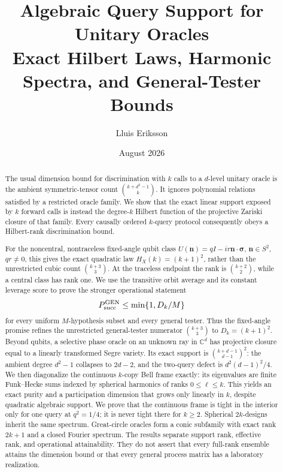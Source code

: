 \documentclass[11pt]{article}
\title{\textbf{Algebraic Query Support for Unitary Oracles}\\
Exact Hilbert Laws, Harmonic Spectra, and General-Tester Bounds}
\author{Lluis Eriksson}
\date{August 2026}
\theoremstyle{definition}
\theoremstyle{remark}
\newcommand{\C}{\mathbb C}
\begin{document}
\maketitle

\begin{abstract}
The usual dimension bound for discrimination with $k$ calls to a $d$-level
unitary oracle is the ambient symmetric-tensor count
$\binom{k+d^2-1}{k}$.  It ignores polynomial relations satisfied by a
restricted oracle family.  We show that the exact linear support exposed by
$k$ forward calls is instead the degree-$k$ Hilbert function of the
projective Zariski closure of that family.  Every causally ordered $k$-query
protocol consequently obeys a Hilbert-rank discrimination bound.

For the noncentral, nontraceless fixed-angle qubit class
$U(\bm n)=qI-ir\bm n\cdot\bm\sigma$, $\bm n\in S^2$, $qr\neq0$, this gives the exact
quadratic law $H_X(k)=(k+1)^2$, rather than the unrestricted cubic count
$\binom{k+3}{3}$.  At the traceless endpoint the rank is
$\binom{k+2}{2}$, while a central class has rank one.  We use the transitive
orbit average and its constant leverage score to
prove the stronger operational statement
\[
 P_{\rm succ}^{\rm GEN}\leq \min\{1,D_k/M\}
\]
for every uniform $M$-hypothesis subset and every general tester.  Thus the
fixed-angle promise refines the unrestricted general-tester numerator
$\binom{k+3}{3}$ to $D_k=(k+1)^2$.  Beyond qubits, a selective phase
oracle on an unknown ray in $\C^d$ has projective closure equal to a linearly
transformed Segre variety.  Its exact support is
$\binom{k+d-1}{d-1}^{\!2}$: the ambient degree $d^2-1$ collapses to $2d-2$,
and the two-query defect is $d^2(d-1)^2/4$.
We then diagonalize the
continuous $k$-copy Bell frame exactly: its eigenvalues are finite
Funk--Hecke sums indexed by spherical harmonics of ranks $0\leq\ell\leq k$.
This yields an exact purity and a participation dimension that grows only
linearly in $k$, despite quadratic algebraic support.  We prove that the
continuous frame is tight in the interior only for one query at $q^2=1/4$;
it is never tight there for $k\geq2$.  Spherical $2k$-designs inherit the same spectrum.
Great-circle oracles form a conic subfamily with exact rank $2k+1$ and a
closed Fourier spectrum.  The results separate support rank, effective rank,
and operational attainability.  They do not assert that every full-rank
ensemble attains the dimension bound or that every general process matrix has
a laboratory realization.
\end{abstract}
\end{document}
